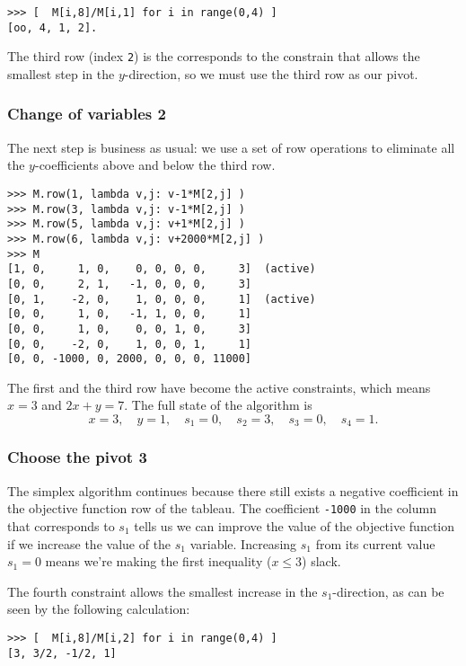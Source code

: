 \documentclass[11pt,oneside]{article}
\begin{document}
\begin{verbatim}
>>> [  M[i,8]/M[i,1] for i in range(0,4) ]
[oo, 4, 1, 2].
\end{verbatim}

	\noindent
	The third row (index \texttt{2}) is the corresponds to the constrain that allows the smallest step
	in the $y$-direction,  so we must use the third row as our pivot.
	
	\subsubsection{Change of variables 2}	
	The next step is business as usual: we use a set of row operations to eliminate all the 
	$y$-coefficients above and below the third row.
	
\begin{verbatim}
>>> M.row(1, lambda v,j: v-1*M[2,j] )
>>> M.row(3, lambda v,j: v-1*M[2,j] )
>>> M.row(5, lambda v,j: v+1*M[2,j] )
>>> M.row(6, lambda v,j: v+2000*M[2,j] )
>>> M
[1, 0,     1, 0,    0, 0, 0, 0,     3]  (active)
[0, 0,     2, 1,   -1, 0, 0, 0,     3]
[0, 1,    -2, 0,    1, 0, 0, 0,     1]  (active)
[0, 0,     1, 0,   -1, 1, 0, 0,     1]
[0, 0,     1, 0,    0, 0, 1, 0,     3]
[0, 0,    -2, 0,    1, 0, 0, 1,     1]
[0, 0, -1000, 0, 2000, 0, 0, 0, 11000]
\end{verbatim}

	\noindent
	The first and the third row have become the active constraints,
	which means $x= 3$ and $2x+y= 7$.
	The full state of the algorithm is
	\[
		x=3, \quad y=1, \quad s_1=0, \quad s_2=3,  \quad s_3=0, \quad s_4=1.
	\]	

	
	
	\bigskip
	
	\subsubsection{Choose the pivot 3}
	The simplex algorithm continues because there still exists a negative coefficient
	in the objective function row of the tableau.
	The coefficient \texttt{-1000} in the column that corresponds to $s_1$ tells us 
	we can improve the value of the objective function if we increase the value of the $s_1$ variable.
	Increasing $s_1$ from its current value $s_1=0$ means we're making the first inequality ($x\leq3$) slack.

	The fourth constraint allows the smallest increase in the $s_1$-direction,
	as can be seen by the following calculation:	
\begin{verbatim}
>>> [  M[i,8]/M[i,2] for i in range(0,4) ]
[3, 3/2, -1/2, 1]
\end{verbatim}
\end{document}
